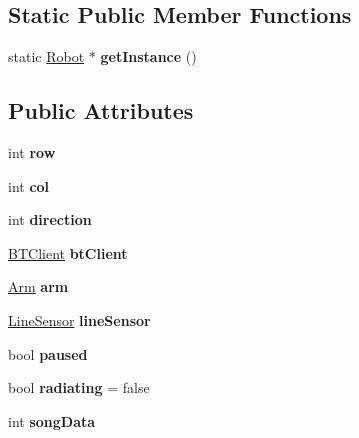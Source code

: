 \subsection*{Static Public Member Functions}
\begin{DoxyCompactItemize}
\item 
\hypertarget{classRobot_ac6f19dc31b435f8a2d43944ba49286d0}{static \hyperlink{classRobot}{Robot} $\ast$ {\bfseries get\-Instance} ()}\label{classRobot_ac6f19dc31b435f8a2d43944ba49286d0}

\end{DoxyCompactItemize}
\subsection*{Public Attributes}
\begin{DoxyCompactItemize}
\item 
\hypertarget{classRobot_a35ce5c416a079fcf6b943843ec151d63}{int {\bfseries row}}\label{classRobot_a35ce5c416a079fcf6b943843ec151d63}

\item 
\hypertarget{classRobot_a2e08d53491bb82defe2e28ee9ce1d096}{int {\bfseries col}}\label{classRobot_a2e08d53491bb82defe2e28ee9ce1d096}

\item 
\hypertarget{classRobot_ac25b4dfc2e9e5aa86ec5684d075d32b8}{int {\bfseries direction}}\label{classRobot_ac25b4dfc2e9e5aa86ec5684d075d32b8}

\item 
\hypertarget{classRobot_a9da91e6d551ed02038e935b3c755cc75}{\hyperlink{classBTClient}{B\-T\-Client} {\bfseries bt\-Client}}\label{classRobot_a9da91e6d551ed02038e935b3c755cc75}

\item 
\hypertarget{classRobot_a444673862cbe384992aceb066282b500}{\hyperlink{classArm}{Arm} {\bfseries arm}}\label{classRobot_a444673862cbe384992aceb066282b500}

\item 
\hypertarget{classRobot_abdc300045bea9a31013b25682629752d}{\hyperlink{classLineSensor}{Line\-Sensor} {\bfseries line\-Sensor}}\label{classRobot_abdc300045bea9a31013b25682629752d}

\item 
\hypertarget{classRobot_a6a1fae6e6ee0a3298b9e60d3f50ad12a}{bool {\bfseries paused}}\label{classRobot_a6a1fae6e6ee0a3298b9e60d3f50ad12a}

\item 
\hypertarget{classRobot_a77f62d85ab1cf34e79c2a3acd470a4ce}{bool {\bfseries radiating} = false}\label{classRobot_a77f62d85ab1cf34e79c2a3acd470a4ce}

\item 
\hypertarget{classRobot_a7818916adfa736ab4cb21011fe302cdb}{int {\bfseries song\-Data}}\label{classRobot_a7818916adfa736ab4cb21011fe302cdb}

\end{DoxyCompactItemize}
